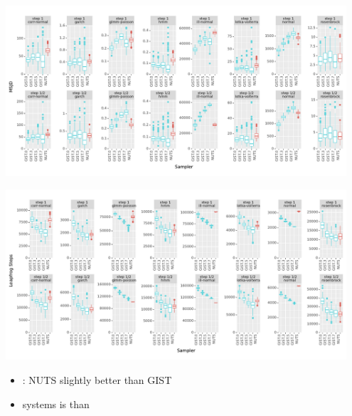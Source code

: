 \documentclass[10pt]{report}
\begin{document}
\vspace*{-9pt}
\begin{center}
  \includegraphics[width=0.95\textwidth]{img/vs_NUTS_MSJD.pdf}
\end{center}

\vspace*{-9pt}
\begin{center}
  \includegraphics[width=0.95\textwidth]{img/vs_NUTS_Leapfrog_Steps.pdf}
\end{center}

\begin{itemize}
\item {}: NUTS slightly better than GIST
\item {} systems is 
  than 
\end{itemize}
\end{document}
